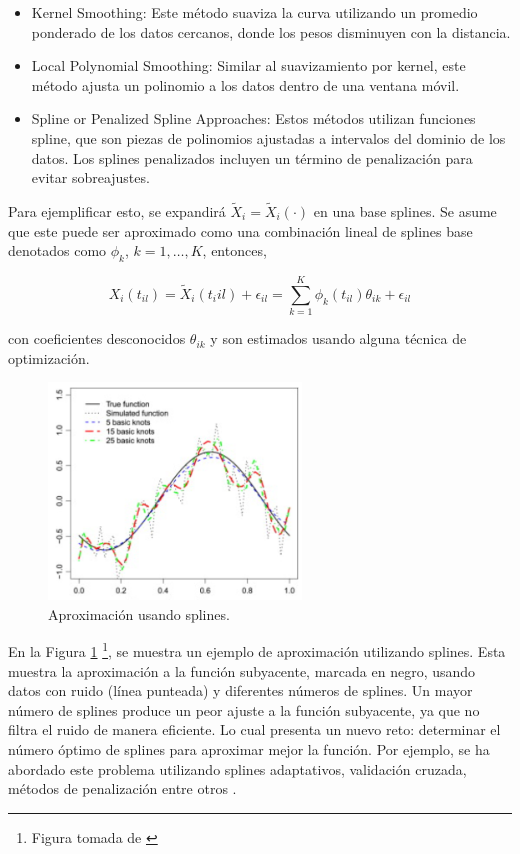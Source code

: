 \begin{itemize}
    \item Kernel Smoothing: Este método suaviza la curva utilizando un promedio ponderado de los datos cercanos, donde los pesos disminuyen con la distancia.

    \item Local Polynomial Smoothing: Similar al suavizamiento por kernel, este método ajusta un polinomio a los datos dentro de una ventana móvil. 

    \item Spline or Penalized Spline Approaches: Estos métodos utilizan funciones spline, que son piezas de polinomios ajustadas a intervalos del dominio de los datos. Los splines penalizados incluyen un término de penalización para evitar sobreajustes.
\end{itemize}

Para ejemplificar esto, se expandirá $\widetilde{X}_i = \widetilde{X}_i(\cdot)$ en una base splines. Se asume que este puede ser aproximado como una combinación lineal de splines base denotados como $\phi_{k}$, $k = 1, \dots, K$, entonces,

\begin{equation}
     X_i(t_{il}) = \widetilde{X}_i(t_i{il}) + \epsilon_{il} = \sum_{k = 1}^{K}\phi_k(t_{il})\theta_{ik} + \epsilon_{il}
\end{equation}

con coeficientes desconocidos $\theta_{ik}$ y son estimados usando alguna técnica de optimización. 

\begin{figure}[H]
    \centering
    \includegraphics[width = 0.6\textwidth ]{Imagenes/splineEj.png}
    \caption{Aproximación usando splines.}
    \label{fig:ejSpline}
\end{figure}


En la Figura \ref{fig:ejSpline} \footnote{Figura tomada de \cite{Aguilera2013}}, se muestra un ejemplo de aproximación utilizando splines. Esta muestra la aproximación a la función subyacente, marcada en negro, usando datos con ruido (línea punteada) y diferentes números de splines. Un mayor número de splines produce un peor ajuste a la función subyacente, ya que no filtra el ruido de manera eficiente. Lo cual presenta un nuevo reto: determinar el número óptimo de splines para aproximar mejor la función. Por ejemplo, se ha abordado este problema utilizando splines adaptativos, validación cruzada, métodos de penalización entre otros \cite{Aguilera2013}.


